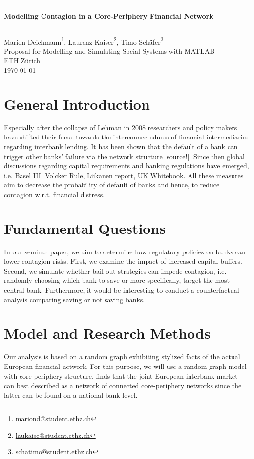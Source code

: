 \documentclass[12pt,a4paper,oneside]{article} %
\begin{document}
\begin{center}
\hrule \vspace{0.4cm}
{\LARGE \bfseries Modelling Contagion in a Core-Periphery
  Financial Network \\[0.4cm] } 
\hrule \vspace{0.4cm} 
Marion Deichmann\footnote{\href{mailto:mariond@student.ethz.ch}{mariond@student.ethz.ch}},
  Laurenz Kaiser\footnote{\href{mailto:laukaise@student.ethz.ch}{laukaise@student.ethz.ch}},
  Timo Schäfer\footnote{\href{mailto:schatimo@student.ethz.ch}{schatimo@student.ethz.ch}} \\[0.1cm]
Proposal for Modelling and Simulating Social Systems with MATLAB \\[0.1cm] ETH Zürich \\[0.1cm] \today 
\end{center}

\section*{General Introduction}
\noindent Especially after the collapse of Lehman in 2008 researchers and policy
makers have shifted their focus towards the interconnectedness of
financial intermediaries regarding interbank lending. It has been shown that the default of a bank
can trigger other banks' failure via the network structure [source!]. Since then global discussions regarding
capital requirements and banking regulations have emerged, i.e. Basel III, Volcker Rule, Liikanen
report, UK Whitebook. All these measures aim to decrease the
probability of default of banks and hence, to reduce contagion
w.r.t. financial distress.

\section*{Fundamental Questions}
In our seminar paper, we aim to determine how regulatory policies
on banks can lower contagion risks. First, we examine the impact of
increased capital buffers. Second, we simulate whether bail-out
strategies can impede contagion, i.e. randomly choosing which bank to
save or more specifically, target the most central bank. Furthermore,
it would be interesting to conduct a counterfactual analysis comparing
saving or not saving banks.

\section*{Model and Research Methods}
Our analysis is based on a random graph exhibiting stylized facts of the
actual European financial network. For this purpose, we will use a
\cite{Erdos1959} random graph model with core-periphery
structure. \cite{Georg2014} finds that the joint European interbank market
can best described as a network of connected core-periphery networks
since the latter can be found on a national bank level. 
\end{document}
